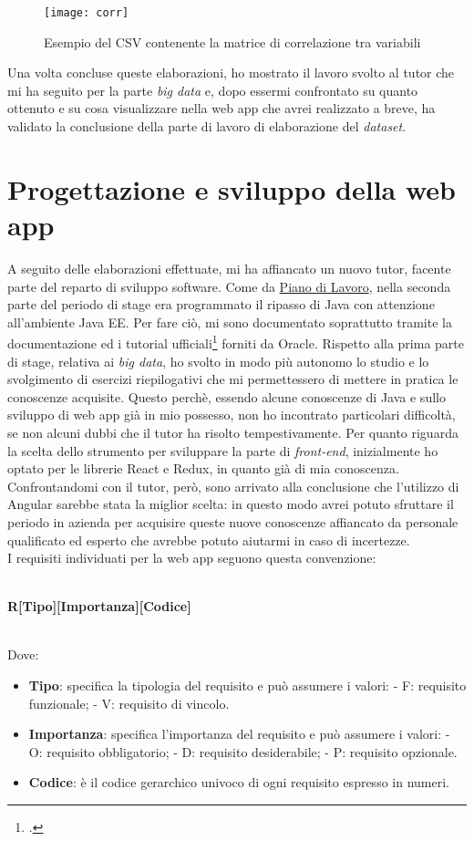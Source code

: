 \begin{figure}[!h]
	\centering
	\texttt{[image: corr]}
	\caption{Esempio del CSV contenente la matrice di correlazione tra variabili}
\end{figure}

Una volta concluse queste elaborazioni, ho mostrato il lavoro svolto al tutor che mi ha seguito per la parte \textit{big data} e, dopo essermi confrontato su quanto ottenuto e su cosa visualizzare nella \gls{web app} che avrei realizzato a breve, ha validato la conclusione della parte di lavoro di elaborazione del \textit{dataset}.

\clearpage
\section{Progettazione e sviluppo della web app}
A seguito delle elaborazioni effettuate, mi ha affiancato un nuovo tutor, facente parte del reparto di sviluppo software. Come da \hyperref[pdl]{Piano di Lavoro}, nella seconda parte del periodo di stage era programmato il ripasso di Java con attenzione all'ambiente Java EE. Per fare ciò, mi sono documentato soprattutto tramite la documentazione ed i tutorial ufficiali\footcite{site:javatutorial} forniti da Oracle. Rispetto alla prima parte di stage, relativa ai \textit{big data}, ho svolto in modo più autonomo lo studio e lo svolgimento di esercizi riepilogativi che mi permettessero di mettere in pratica le conoscenze acquisite. Questo perchè, essendo alcune conoscenze di Java e sullo sviluppo di \gls{web app} già in mio possesso, non ho incontrato particolari difficoltà, se non alcuni dubbi che il tutor ha risolto tempestivamente.
Per quanto riguarda la scelta dello strumento per sviluppare la parte di \textit{front-end}, inizialmente ho optato per le librerie React e Redux, in quanto già di mia conoscenza. Confrontandomi con il tutor, però, sono arrivato alla conclusione che l'utilizzo di Angular sarebbe stata la miglior scelta: in questo modo avrei potuto sfruttare il periodo in azienda per acquisire queste nuove conoscenze affiancato da personale qualificato ed esperto che avrebbe potuto aiutarmi in caso di incertezze. \\
I requisiti individuati per la \gls{web app} seguono questa convenzione:\\\\
\centerline{\textbf{R[Tipo][Importanza][Codice]}}\\
Dove:
\begin{itemize}
	\item \textbf{Tipo}: specifica la tipologia del requisito e può assumere i valori:
	\subitem - F: requisito funzionale;
	\subitem - V: requisito di vincolo.
	\item \textbf{Importanza}: specifica l'importanza del requisito e può assumere i valori:
	\subitem - O: requisito obbligatorio;
	\subitem - D: requisito desiderabile;
	\subitem - P: requisito opzionale.
	\item  \textbf{Codice}: è il codice gerarchico univoco di ogni requisito espresso in numeri.
\end{itemize} 
